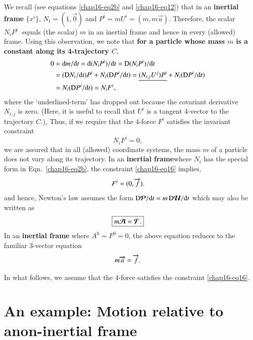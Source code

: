 We recall (see equations \eqref{chap16-eq2b} and \eqref{chap16-eq12})  that in  an \textbf{inertial frame} $\{x^i\}$, $N_i=(1,\vec{0})$ and $P^i=mU^i= (m,m\vec{u})$. Therefore,  the scalar $N_iP^i\;$ equals (the scalar) $m$ in  an inertial frame and hence in every (allowed) frame. Using this observation, we note that  \textbf{for a particle whose mass $m$ is a constant along its 4-trajectory $C$},
\begin{align*}
0 &= \mathrm{d} m/\mathrm{d} t = \mathrm{d} (N_i P^i )/\mathrm{d} t =
{\mathrm{D}}(N_i P^i )/\mathrm{d} t  \notag \\  
&=({\mathrm{D}}N_i/\mathrm{d} t)P^i + N_i ({\mathrm{D}}P^i/\mathrm{d} t) 
= 
\underline{(N_{i;j}U^j)P^i 
} +N_i({\mathrm{D}}P^i/\mathrm{d} t) \notag \\  
&= N_i({\mathrm{D}}P^i/\mathrm{d} t) = N_i F^i,
\end{align*}
where the `underlined-term' has dropped  out because the covariant derivative $N_{i;j}$ is zero. (Here, it is useful to recall that $U^i$ is a tangent 4-vector to the trajectory $C$.), Thus, if we require that the  4-force  $F^i $ satisfies the  invariant constraint
\begin{equation}
N_i F^i =0,\label{chap16-eq16}
\end{equation}
we are assured that in all (allowed) coordinate systems, the mass $m$ of a particle does not vary along its trajectory. In an \textbf{inertial frame}where $N_i$ has the special form in Eqn.~\eqref{chap16-eq2b}, the constraint \eqref{chap16-eq16} implies, 
\begin{equation}
F^i =(0, \overrightarrow{f}).\label{chap16-eq17}
\end{equation}
and hence, Newton's law assumes the form ${{\mathrm{D}}}\bm{\mathcal{P}}/\mathrm{d} t=m\,{{\mathrm{D}}}\bm{\mathcal{U}}/\mathrm{d} t $  which may also be written as
\begin{equation}
\boxed{m\bm{\mathcal{A}}  =\bm{\mathcal{F}}.}\label{chap16-eq18}
\end{equation}
In an \textbf{inertial frame} where $ A^0 =F^0=0$, the above equation reduces to the familiar 3-vector equation
\begin{equation}
m\overrightarrow{a}  =\overrightarrow{f}.\label{chap16-eq19}
\end{equation}

In what follows, we assume that the 4-force satisfies the constraint \eqref{chap16-eq16}.

\section{An example: Motion relative to a\hfil\break non-inertial frame}\label{chap16-sec6}

